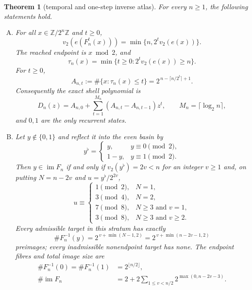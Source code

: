 \documentclass[a4paper,10pt]{amsart}
\newtheorem{theorem}{Theorem}
\theoremstyle{remark}
\newcommand{\Zn}{\mathbb Z/2^n\mathbb Z}
\newcommand{\im}{\operatorname{im}}
\newcommand{\vtwo}{v_2}
\begin{document}
\begin{theorem}[temporal and one-step inverse atlas]\label{thm:atlas}
For every $n\geq1$, the following statements hold.
\begin{enumerate}[(A)]
\item For all $x\in\Zn$ and $t\geq0$,
\begin{equation}\label{eq:valuation-clock}
 \vtwo(e(F_n^t(x)))=\min\{n,2^t\vtwo(e(x))\}.
\end{equation}
The reached endpoint is $x\bmod2$, and
\begin{equation}\label{eq:entry-time}
 \tau_n(x)=\min\{t\geq0:2^t\vtwo(e(x))\geq n\}.
\end{equation}
For $t\geq0$,
\begin{equation}\label{eq:cdf}
 A_{n,t}:=\#\{x:\tau_n(x)\leq t\}
 =2^{\,n-\lceil n/2^t\rceil+1}.
\end{equation}
Consequently the exact shell polynomial is
\begin{equation}\label{eq:shell-polynomial}
 D_n(z)=A_{n,0}+\sum_{t=1}^{M_n}(A_{n,t}-A_{n,t-1})z^t,
 \qquad M_n=\lceil\log_2 n\rceil,
\end{equation}
and $0,1$ are the only recurrent states.

\item Let $y\notin\{0,1\}$ and reflect it into the even basin by
\[
 y^\flat=\begin{cases}y,&y\equiv0\pmod2,\\1-y,&y\equiv1\pmod2.
 \end{cases}
\]
Then $y\in\im F_n$ if and only if
$\vtwo(y^\flat)=2v<n$ for an integer $v\geq1$ and, on putting
$N=n-2v$ and $u=y^\flat/2^{2v}$,
\begin{equation}\label{eq:image-condition}
 u\equiv
 \begin{cases}
 1\pmod2,&N=1,\\
 3\pmod4,&N=2,\\
 7\pmod8,&N\geq3\text{ and }v=1,\\
 3\pmod8,&N\geq3\text{ and }v\geq2.
 \end{cases}
\end{equation}
Every admissible target in this stratum has exactly
\begin{equation}\label{eq:fibre}
 \#F_n^{-1}(y)=2^{\,v+\min(N-1,2)}
 =2^{\,v+\min(n-2v-1,2)}
\end{equation}
preimages; every inadmissible nonendpoint target has none.  The endpoint
fibres and total image size are
\begin{align}
 \#F_n^{-1}(0)=\#F_n^{-1}(1)&=2^{\lfloor n/2\rfloor},
 \label{eq:endpoint-fibres}\\
 \#\im F_n&=2+2\sum_{1\leq v<n/2}
 2^{\max(0,n-2v-3)}.\label{eq:image-size}
\end{align}
\end{enumerate}
\end{theorem}
\end{document}
